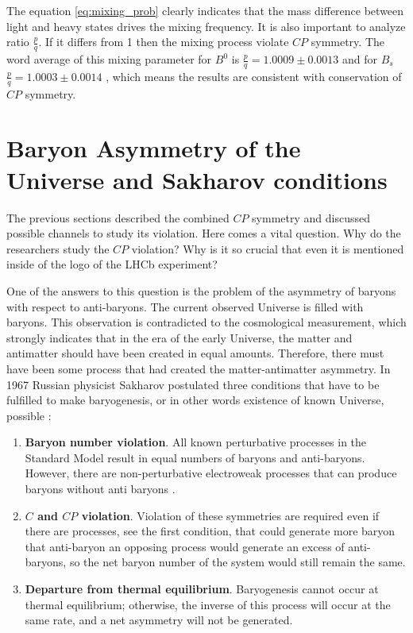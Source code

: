 The equation \ref{eq:mixing_prob} clearly indicates that the mass difference between light and heavy states drives the mixing frequency. It is also important to analyze ratio $\frac{p}{q}$. If it differs from 1 then the mixing process violate $CP$ symmetry. The word average of this mixing parameter for $B^{0}$ is  $\frac{p}{q} = 1.0009 \pm 0.0013$ and  for $B_s$  $\frac{p}{q} = 1.0003 \pm 0.0014$ \cite{PDG}, which means the results are consistent with conservation of $CP$ symmetry. 

\section{Baryon Asymmetry of the Universe and Sakharov conditions}

The previous sections described the combined $CP$ symmetry and discussed possible channels to study its violation. Here comes a vital question. Why do the researchers study the $CP$ violation? Why is it so crucial that even it is mentioned inside of the logo of the LHCb experiment? 

One of the answers to this question is the problem of the asymmetry of baryons with respect to anti-baryons. The current observed Universe is filled with baryons.  This observation is contradicted to the cosmological measurement, which strongly indicates that in the era of the early Universe, the matter and antimatter should have been created in equal amounts. Therefore, there must have been some process that had created the matter-antimatter asymmetry.  
In 1967 Russian physicist Sakharov postulated three conditions that have to be fulfilled to make baryogenesis, or in other words existence of known Universe,  possible \cite{sakharov}: 

\begin{enumerate}
    \item \textbf{Baryon number violation}.  All known perturbative processes in the Standard Model result in equal numbers of baryons and anti-baryons. However, there are non-perturbative electroweak processes that can produce baryons without anti baryons \cite{bayron_number_violation}. 
    \item \textbf{$C$ and $CP$ violation}. Violation of these symmetries are required even if there are processes, see the first condition, that could generate more baryon that anti-baryon an opposing process would generate an excess of anti-baryons, so the net baryon number of the system would still remain the same.
    \item \textbf{Departure from thermal equilibrium}. Baryogenesis cannot occur at thermal equilibrium; otherwise, the inverse of this process will occur at the same rate, and a net asymmetry will not be generated.
\end{enumerate}

